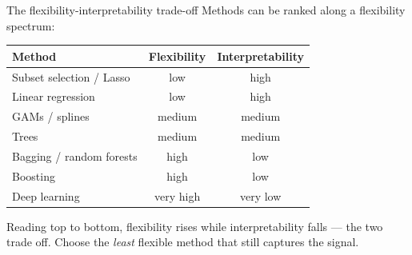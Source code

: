 \documentclass[aspectratio=169,11pt]{beamer}
\begin{document}
\begin{frame}{The flexibility-interpretability trade-off}
  Methods can be ranked along a flexibility spectrum:
  \begin{center}
  \footnotesize
  \begin{tabular}{lcc}
    \toprule
    \textbf{Method} & \textbf{Flexibility} & \textbf{Interpretability} \\
    \midrule
    Subset selection / Lasso & low & high \\
    Linear regression & low & high \\
    GAMs / splines & medium & medium \\
    Trees & medium & medium \\
    Bagging / random forests & high & low \\
    Boosting & high & low \\
    Deep learning & very high & very low \\
    \bottomrule
  \end{tabular}
  \end{center}
  \begin{takeaway}Reading top to bottom, flexibility rises while interpretability falls --- the two trade off. Choose the \emph{least} flexible method that still captures the signal.\end{takeaway}
\end{frame}
\end{document}
